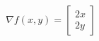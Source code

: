 \documentclass[preview]{standalone}
\begin{document}
\begin{align*}
\nabla f(x, y) = \begin{bmatrix} 2x \\ 2y \end{bmatrix}
\end{align*}
\end{document}
